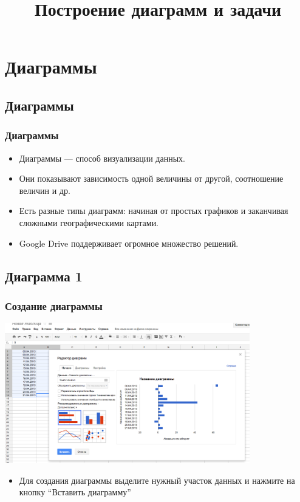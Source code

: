 \documentclass[compress,red]{beamer}
\title{Построение диаграмм и задачи}
\begin{document}
\maketitle

\section{Диаграммы}

\subsection{Диаграммы}
\begin{frame}[fragile]
  \frametitle{Диаграммы}
  \begin{itemize}
      \item Диаграммы --- способ визуализации данных.
      \item Они показывают зависимость одной величины от другой, соотношение величин и др.
      \item Есть разные типы диаграмм: начиная от простых графиков и заканчивая сложными географическими картами.
      \item Google Drive поддерживает огромное множество решений.
  \end{itemize}
\end{frame}

\subsection{Диаграмма 1}
\begin{frame}[fragile]
  \frametitle{Создание диаграммы}
  \centerline{\includegraphics[width=0.8\textwidth]{images/02.png}}
  \begin{itemize}
      \item Для создания диаграммы выделите нужный участок данных и нажмите на кнопку ``Вставить диаграмму''
  \end{itemize}
\end{frame}
\end{document}
